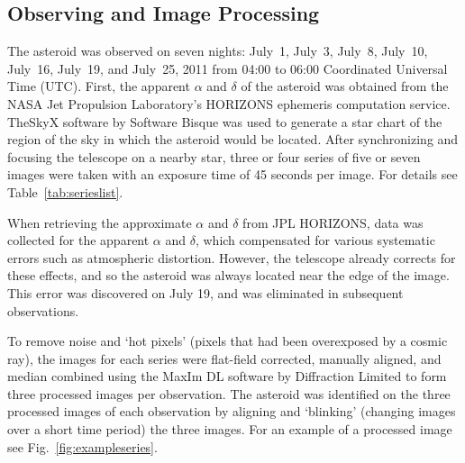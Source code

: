 \documentclass[12pt,journal,compsoc]{IEEEtran}
\begin{document}
\subsection{Observing and Image Processing}
The asteroid was observed on seven nights: July~1, July~3, July~8, July~10, July~16, July~19, and July~25, 2011 
from 04:00 to 06:00 Coordinated Universal Time (UTC).
First, the apparent $\alpha$ and $\delta$ of the asteroid was obtained from the
NASA Jet Propulsion Laboratory's HORIZONS ephemeris computation service.
TheSkyX software by Software Bisque was used to generate a star chart of the region of the sky 
in which the asteroid would be located.
After synchronizing and focusing the telescope on a nearby star, 
three or four series of five or seven images were taken 
with an exposure time of 45 seconds per image. For details see Table~\ref{tab:serieslist}.

When retrieving the approximate $\alpha$ and $\delta$ from JPL HORIZONS, 
data was collected for the apparent $\alpha$ and $\delta$,
which compensated for various systematic errors such as atmospheric distortion.
However, the telescope already corrects for these effects, 
and so the asteroid was always located near the edge of the image. 
This error was discovered on July 19, and was eliminated in subsequent observations.

To remove noise and `hot pixels' (pixels that had been overexposed by a cosmic ray), 
the images for each series were flat-field corrected, manually aligned, and median combined 
using the MaxIm DL software by Diffraction Limited to form three processed images per observation.
The asteroid was identified on the three processed images of each observation 
by aligning and `blinking' (changing images over a short time period) the three images.
For an example of a processed image see Fig.~\ref{fig:exampleseries}.
\end{document}
